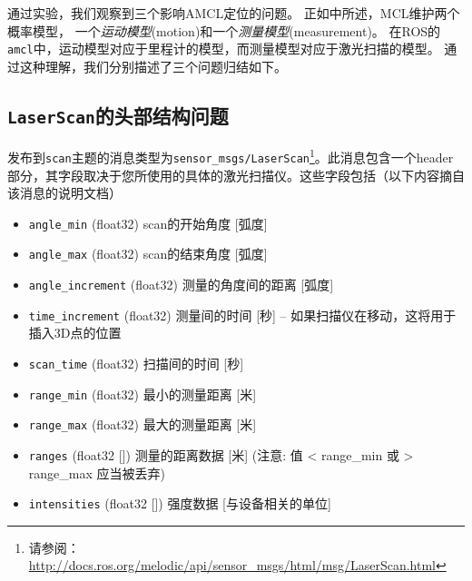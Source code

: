 通过实验，我们观察到三个影响AMCL定位的问题。 正如\cite{thrun2005probabilistic}中所述，MCL维护两个概率模型，
一个\emph{运动模型}(motion)和一个\emph{测量模型}(measurement)。 
在ROS的\texttt{amcl}中，运动模型对应于里程计的模型，而测量模型对应于激光扫描的模型。 
通过这种理解，我们分别描述了三个问题归结如下。

\subsection[Header in \texttt{LaserScan} messages]{ \texttt{LaserScan}的头部结构问题}%

发布到\texttt{scan}主题的消息类型为\texttt{sensor_msgs/LaserScan}\footnote{请参阅：\url{http://docs.ros.org/melodic/api/sensor_msgs/html/msg/LaserScan.html}}。此消息包含一个header部分，其字段取决于您所使用的具体的激光扫描仪。这些字段包括（以下内容摘自该消息的说明文档）

\begin{itemize}
	\item \texttt{angle_min} (float32) scan的开始角度 [弧度] %
	\item \texttt{angle_max} (float32) scan的结束角度 [弧度] %
	\item \texttt{angle_increment} (float32) 测量的角度间的距离 [弧度] %
	\item \texttt{time_increment} (float32) 测量间的时间 [秒] -- 如果扫描仪在移动，这将用于插入3D点的位置 %
	\item \texttt{scan_time} (float32) 扫描间的时间 [秒] %
	\item \texttt{range_min} (float32) 最小的测量距离 [米]%
	\item \texttt{range_max} (float32) 最大的测量距离 [米] %
	
	\item \texttt{ranges} (float32 [])  测量的距离数据 [米] (注意: 值 < range\_min 或 > range\_max 应当被丢弃)
	\item \texttt{intensities} (float32 []) 强度数据 [与设备相关的单位]
\end{itemize}

